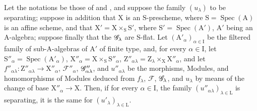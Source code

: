 \begin{lemma}[11.9.12]
\label{IV.11.9.12}
Let the notations be those of  and , and suppose the family $(u_\lambda)$ to be separating; suppose in addition that $\mathrm{X}$ is an $\mathrm{S}$-prescheme, where $\mathrm{S}=\operatorname{Spec}(\mathrm{A})$ is an affine scheme, and that $\mathrm{X}'=\mathrm{X}\times_\mathrm{S}\mathrm{S}'$, where $\mathrm{S}'=\operatorname{Spec}(\mathrm{A}')$, $\mathrm{A}'$ being an $\mathrm{A}$-algebra; suppose finally that the $\mathscr{G}_\lambda$ are $\mathrm{S}$-\textup{flat}.
Let $(\mathrm{A}'_\alpha)_{\alpha\in\mathrm{I}}$ be the filtered family of sub-$\mathrm{A}$-algebras of $\mathrm{A}'$ of finite type, and, for every $\alpha\in\mathrm{I}$, let $\mathrm{S}''_\alpha=\operatorname{Spec}(\mathrm{A}'_\alpha)$, $\mathrm{X}''_\alpha=\mathrm{X}\times_\mathrm{S}\mathrm{S}''_\alpha$, $\mathrm{Z}''_{\alpha\lambda}=\mathrm{Z}_\lambda\times_\mathrm{X}\mathrm{X}''_\alpha$, and let $f''_{\alpha\lambda}:\mathrm{Z}''_{\alpha\lambda}\to\mathrm{X}''_\alpha$, $\mathscr{F}''_\alpha$, $\mathscr{G}''_{\alpha\lambda}$, and $u''_{\alpha\lambda}$ be the morphisms, Modules, and homomorphisms of Modules deduced from $f_\lambda$, $\mathscr{F}$, $\mathscr{G}_\lambda$, and $u_\lambda$ by means of the change of base $\mathrm{X}''_\alpha\to\mathrm{X}$.
Then, if for every $\alpha\in\mathrm{I}$, the family $(u''_{\alpha\lambda})_{\lambda\in\mathrm{L}}$ is separating, it is the same for $(u'_\lambda)_{\lambda\in\mathrm{L}}$.
\end{lemma}


